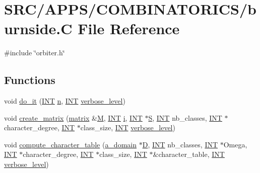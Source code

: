 \hypertarget{burnside_8_c}{}\section{S\+R\+C/\+A\+P\+P\+S/\+C\+O\+M\+B\+I\+N\+A\+T\+O\+R\+I\+C\+S/burnside.C File Reference}
\label{burnside_8_c}
{\ttfamily \#include \char`\"{}orbiter.\+h\char`\"{}}\newline
\subsection*{Functions}
\begin{DoxyCompactItemize}
\item 
void \mbox{\hyperlink{burnside_8_c_a6a1ed4d46bdb13e56112f47f0565c25b}{do\+\_\+it}} (\mbox{\hyperlink{galois_8h_a09fddde158a3a20bd2dcadb609de11dc}{I\+NT}} \mbox{\hyperlink{simeon_8_c_a7f2cd26777ce0ff3fdaf8d02aacbddfb}{n}}, \mbox{\hyperlink{galois_8h_a09fddde158a3a20bd2dcadb609de11dc}{I\+NT}} \mbox{\hyperlink{simeon_8_c_a818073fbcc2f439e7c56952f67386122}{verbose\+\_\+level}})
\item 
void \mbox{\hyperlink{burnside_8_c_a119d6354723990b1e80fc9bbacdb85fd}{create\+\_\+matrix}} (\mbox{\hyperlink{classmatrix}{matrix}} \&\mbox{\hyperlink{plane__search_8_c_ad2d23ebd03187a91edd45b1d5e496265}{M}}, \mbox{\hyperlink{galois_8h_a09fddde158a3a20bd2dcadb609de11dc}{I\+NT}} \mbox{\hyperlink{alphabet2_8_c_acb559820d9ca11295b4500f179ef6392}{i}}, \mbox{\hyperlink{galois_8h_a09fddde158a3a20bd2dcadb609de11dc}{I\+NT}} $\ast$\mbox{\hyperlink{simeon_8_c_adab47f8243f1b5a2c31df2535d6b37d0}{S}}, \mbox{\hyperlink{galois_8h_a09fddde158a3a20bd2dcadb609de11dc}{I\+NT}} nb\+\_\+classes, \mbox{\hyperlink{galois_8h_a09fddde158a3a20bd2dcadb609de11dc}{I\+NT}} $\ast$character\+\_\+degree, \mbox{\hyperlink{galois_8h_a09fddde158a3a20bd2dcadb609de11dc}{I\+NT}} $\ast$class\+\_\+size, \mbox{\hyperlink{galois_8h_a09fddde158a3a20bd2dcadb609de11dc}{I\+NT}} \mbox{\hyperlink{simeon_8_c_a818073fbcc2f439e7c56952f67386122}{verbose\+\_\+level}})
\item 
void \mbox{\hyperlink{burnside_8_c_a594d6fa815b4bbd4051678525d259daa}{compute\+\_\+character\+\_\+table}} (\mbox{\hyperlink{classa__domain}{a\+\_\+domain}} $\ast$\mbox{\hyperlink{costas_8_c_af13967e8da5ae214c112fd612639beaa}{D}}, \mbox{\hyperlink{galois_8h_a09fddde158a3a20bd2dcadb609de11dc}{I\+NT}} nb\+\_\+classes, \mbox{\hyperlink{galois_8h_a09fddde158a3a20bd2dcadb609de11dc}{I\+NT}} $\ast$Omega, \mbox{\hyperlink{galois_8h_a09fddde158a3a20bd2dcadb609de11dc}{I\+NT}} $\ast$character\+\_\+degree, \mbox{\hyperlink{galois_8h_a09fddde158a3a20bd2dcadb609de11dc}{I\+NT}} $\ast$class\+\_\+size, \mbox{\hyperlink{galois_8h_a09fddde158a3a20bd2dcadb609de11dc}{I\+NT}} $\ast$\&character\+\_\+table, \mbox{\hyperlink{galois_8h_a09fddde158a3a20bd2dcadb609de11dc}{I\+NT}} \mbox{\hyperlink{simeon_8_c_a818073fbcc2f439e7c56952f67386122}{verbose\+\_\+level}})

\end{DoxyCompactItemize}
